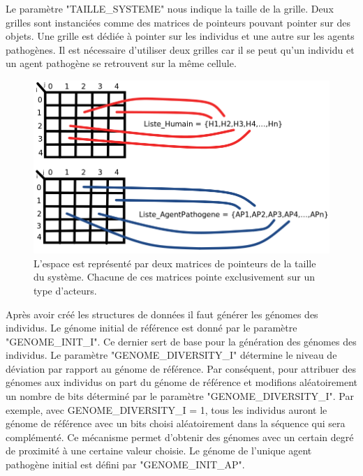 Le paramètre {\small "TAILLE\_SYSTEME"} nous indique la taille de la grille. Deux grilles sont instanciées comme des matrices de pointeurs pouvant pointer sur des objets. Une grille est dédiée à pointer sur les individus et une autre sur les agents pathogènes. Il est nécessaire d'utiliser deux grilles car il se peut qu'un individu et un agent pathogène se retrouvent sur la même cellule.\\

\begin{figure}[h]
\centering
\captionsetup{justification=centering}
\includegraphics[scale=0.4]{Images/MatricesPointeurs.png}
\caption[Matrices de pointeurs]{L'espace est représenté par deux matrices de pointeurs de la taille du système. Chacune de ces matrices pointe exclusivement sur un type d'acteurs.}
\end{figure}

Après avoir créé les structures de données il faut générer les génomes des individus. Le génome initial de référence est donné par le paramètre {\small "GENOME\_INIT\_I"}. Ce dernier sert de base pour la génération des génomes des individus. Le paramètre {\small "GENOME\_DIVERSITY\_I"} détermine le niveau de déviation par rapport au génome de référence. Par conséquent, pour attribuer des génomes aux individus on part du génome de référence et modifions aléatoirement un nombre de bits déterminé par le paramètre {\small "GENOME\_DIVERSITY\_I"}. Par exemple, avec {\small GENOME\_DIVERSITY\_I} = 1, tous les individus auront le génome de référence avec un bits choisi aléatoirement dans la séquence qui sera complémenté. Ce mécanisme permet d'obtenir des génomes avec un certain degré de proximité à une certaine valeur choisie. Le génome de l'unique agent pathogène initial est défini par {\small "GENOME\_INIT\_AP"}.\\

